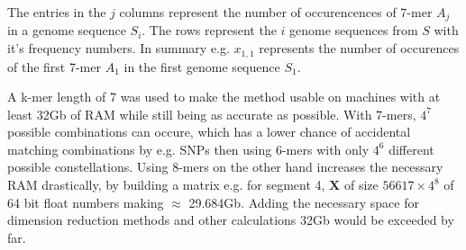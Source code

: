 The entries in the $j$ columns represent the number of occurencences of 7-mer $A_j$ in a genome sequence $S_i$. The rows represent the $i$ genome sequences from $S$ with it's frequency numbers. In summary e.g. $x_{1,1}$ represents the number of occurences of the first 7-mer $A_1$ in the first genome sequence $S_1$.

A k-mer length of 7 was used to make the method usable on machines with at least 32Gb of RAM while still being as accurate as possible. With 7-mers, $4^7$ possible combinations can occure, which has a lower chance of accidental matching combinations by e.g. \glspl{SNP} then using 6-mers with only $4^6$ different possible constellations. Using 8-mers on the other hand increases the necessary RAM drastically, by building a matrix e.g. for segment 4, $\mathbf{X}$ of size $56617 \times 4^8$ of 64 bit float numbers making $\approx$ 29.684Gb. Adding the necessary space for dimension reduction methods and other calculations 32Gb would be exceeded by far. 
